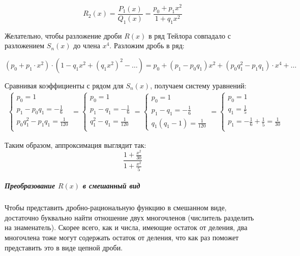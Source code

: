 \documentclass{article}
\begin{document}
    $$R_2(x) = \frac{P_1(x)}{Q_1(x)} = \frac{p_0 + p_1x^2}{1 + q_1x^2}$$

    Желательно, чтобы разложение дроби $R(x)$ в ряд Тейлора совпадало 
    с разложением $S_n(x)$ до члена $x^4$. Разложим дробь в ряд:

    $$(p_0 + p_1 \cdot x^2) \cdot (1 - q_1x^2 + (q_1x^2)^2 - \dots) = p_0 + (p_1 - p_0q_1)x^2 + (p_0q_1^2 - p_1q_1)\cdot x^4 + \dots$$

    Сравнивая коэффициенты с рядом для $S_n(x)$, 
    получаем систему уравнений:
    \begin{eqnarray*}
        \begin{cases}
            p_0 = 1 \\
            p_1 - p_0q_1 = -\frac{1}{6} \\
            p_0q_1^2 - p_1q_1 = \frac{1}{120} \\ 
        \end{cases} = 
        \begin{cases}
            p_0 = 1 \\
            p_1 - q_1 = -\frac{1}{6} \\
            q_1^2 - q_1 = \frac{1}{120} \\
        \end{cases} =
        \begin{cases}
            p_0 = 1 \\
            p_1 - q_1 = -\frac{1}{6} \\
            q_1(q_1 - 1) = \frac{1}{120}
        \end{cases} = 
        \begin{cases}
            p_0 = 1 \\
            q_1 = \frac{1}{5} \\
            p_1 = -\frac{1}{6} + \frac{1}{5} = \frac{1}{30} \\
        \end{cases}
    \end{eqnarray*}

    Таким образом, аппроксимация выглядит так:
    $$\frac{1 + \frac{x^2}{30}}{1 + \frac{x^2}{5}}$$

    \subparagraph{Преобразование $R(x)$ в смешанный вид}
    Чтобы представить дробно-рациональную функцию в смешанном виде,
    достаточно буквально найти отношение двух многочленов (числитель разделить на знаменатель).
    Скорее всего, как и числа, имеющие остаток от деления, два многочлена тоже
    могут содержать остаток от деления, что как раз поможет представить это в виде цепной дроби.
\end{document}
